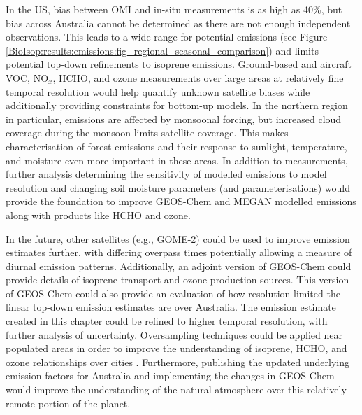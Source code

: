   In the US, bias between OMI and in-situ measurements is as high as 40\%, but 
  bias across Australia cannot be determined as there are not enough independent observations.
  This leads to a wide range for potential emissions (see Figure \ref{BioIsop:results:emissions:fig_regional_seasonal_comparison}) and limits potential top-down refinements to isoprene emissions.
  Ground-based and aircraft VOC, NO$_x$, HCHO, and ozone measurements over large areas at relatively fine temporal resolution would help quantify unknown satellite biases while additionally providing constraints for bottom-up models.
  In the northern region in particular, emissions are affected by monsoonal forcing, but increased cloud coverage during the monsoon limits satellite coverage. 
  This makes characterisation of forest emissions and their response to sunlight, temperature, and moisture even more important in these areas.
  In addition to measurements, further analysis determining the sensitivity of modelled emissions to model resolution and changing soil moisture parameters (and parameterisations) would provide the foundation to improve GEOS-Chem and MEGAN modelled emissions along with products like HCHO and ozone.
  
  In the future, other satellites (e.g., GOME-2) could be used to improve emission estimates further, with differing overpass times potentially allowing a measure of diurnal emission patterns.
  Additionally, an adjoint version of GEOS-Chem could provide details of isoprene transport and ozone production sources.
  This version of GEOS-Chem could also provide an evaluation of how resolution-limited the linear top-down emission estimates are over Australia.
  The emission estimate created in this chapter could be refined to higher temporal resolution, with further analysis of uncertainty.
  Oversampling techniques could be applied near populated areas in order to improve the understanding of isoprene, HCHO, and ozone relationships over cities \parencite[e.g.,][]{Surl2018}.
  Furthermore, publishing the updated underlying emission factors for Australia and implementing the changes in GEOS-Chem would improve the understanding of the natural atmosphere over this relatively remote portion of the planet. %

%  
  